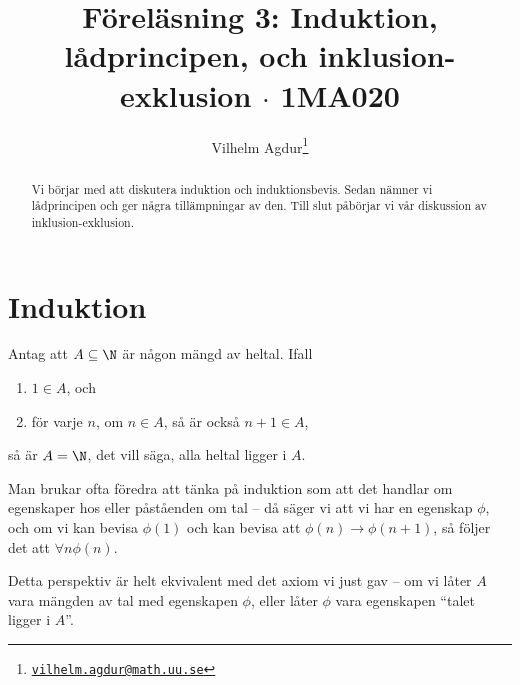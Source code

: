 \documentclass[nobib]{tufte-handout}
\title{Föreläsning 3: Induktion, lådprincipen, och inklusion-exklusion $\cdot$ 1MA020}
\author[Vilhelm Agdur]{Vilhelm Agdur\thanks{\href{mailto:vilhelm.agdur@math.uu.se}{\nolinkurl{vilhelm.agdur@math.uu.se}}}}
\begin{document}
\maketitle%

\begin{abstract}
\noindent
Vi börjar med att diskutera induktion och induktionsbevis. Sedan nämner vi lådprincipen och ger några tillämpningar av den. Till slut påbörjar vi vår diskussion av inklusion-exklusion.
\end{abstract}

\section{Induktion}

\begin{axiom}
  Antag att $A \subseteq \N$ är någon mängd av heltal. Ifall
  \begin{enumerate}
    \item $1 \in A$, och
    \item för varje $n$, om $n \in A$, så är också $n + 1 \in A$,
  \end{enumerate}
  så är $A = \N$, det vill säga, alla heltal ligger i $A$.
\end{axiom}

Man brukar ofta föredra att tänka på induktion som att det handlar om egenskaper hos eller påståenden om tal -- då säger vi att vi har en egenskap $\phi$, och om vi kan bevisa $\phi(1)$ och kan bevisa att $\phi(n) \rightarrow \phi(n+1)$, så följer det att $\forall n \phi(n)$.

Detta perspektiv är helt ekvivalent med det axiom vi just gav -- om vi låter $A$ vara mängden av tal med egenskapen $\phi$, eller låter $\phi$ vara egenskapen ``talet ligger i $A$''.
\end{document}
